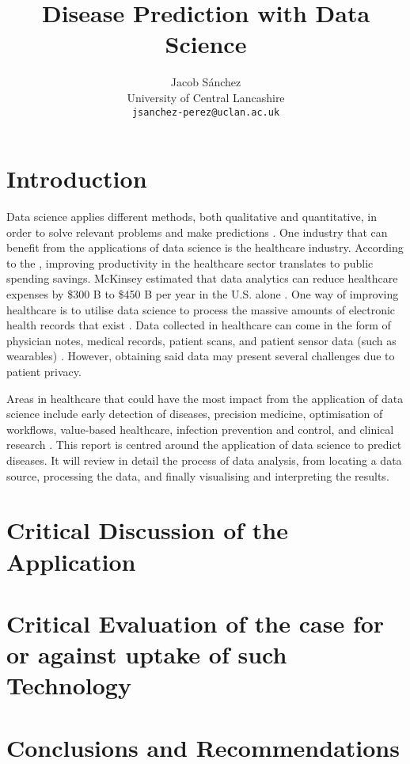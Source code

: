 \documentclass[a4paper,12pt]{article}
\title{Disease Prediction with Data Science}
\author{Jacob Sánchez\\ University of Central Lancashire\\\texttt{jsanchez-perez@uclan.ac.uk}}
\date{}
\begin{document}
\maketitle


\section{Introduction}

Data science applies different methods, both qualitative and quantitative, in order to solve relevant problems and make predictions \parencite[78]{Waller2013}. One industry that can benefit from the applications of data science is the healthcare industry. According to the \textcite{oecd2010health}, improving productivity in the healthcare sector translates to public spending savings. McKinsey estimated that data analytics can reduce healthcare expenses by \$300 B to \$450 B per year in the U.S. alone \parencite{Groves2013}. One way of improving healthcare is to utilise data science to process the massive amounts of electronic health records that exist \parencite{Dalianis2015}. Data collected in healthcare can come in the form of physician notes, medical records, patient scans, and patient sensor data (such as wearables) \parencite{Adam2017}. However, obtaining said data may present several challenges due to patient privacy. 

Areas in healthcare that could have the most impact from the application of data science include early detection of diseases, precision medicine, optimisation of workflows, value-based healthcare, infection prevention and control, and clinical research \parencite[9]{Consoli2019}. This report is centred around the application of data science to predict diseases. It will review in detail the process of data analysis, from locating a data source, processing the data, and finally visualising and interpreting the results.




\section{Critical Discussion of the Application}
\section{Critical Evaluation of the case for or against uptake of such Technology}
\section{Conclusions and Recommendations}

\printbibliography
\end{document}
